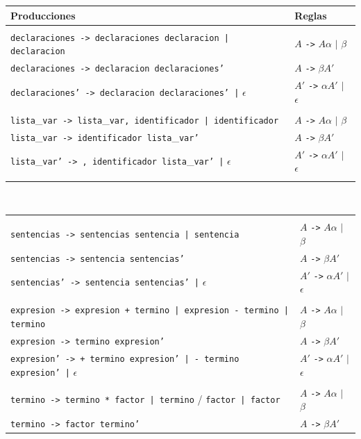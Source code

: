 \documentclass[11pt]{report}
\begin{document}
\begin{enumerate}
\begin{enumerate}[label=\alph*.]
     \begin{tabular}{ |p{13cm}|l| }
  \hline
  \textbf{Producciones} & \textbf{Reglas} \\
  \hline
  & \\
  \texttt{declaraciones -> declaraciones declaracion | declaracion} & $A$ \texttt{->} $A \alpha$ $|$ $\beta$ \\
  \texttt{declaraciones -> declaracion declaraciones'} & $A$ \texttt{->} $\beta A'$ \\
  \texttt{declaraciones' -> declaracion declaraciones' |} $\epsilon$  & $A'$ \texttt{->} $\alpha A'$ $|$ $\epsilon$ \\
  & \\
  \texttt{lista}\_\texttt{var -> lista}\_\texttt{var, identificador | identificador} & $A$ \texttt{->} $A \alpha$ $|$ $\beta$ \\
  \texttt{lista}\_\texttt{var -> identificador lista}\_\texttt{var'} & $A$ \texttt{->} $\beta A'$ \\
  \texttt{lista}\_\texttt{var' -> , identificador lista}\_\texttt{var' |} $\epsilon$ & $A'$ \texttt{->} $\alpha A'$ $|$ $\epsilon$ \\
  & \\
\end{tabular} \\
    \begin{tabular}{ |p{13cm}|l| }
  & \\
  \texttt{sentencias -> sentencias sentencia | sentencia} & $A$ \texttt{->} $A \alpha$ $|$ $\beta$ \\
  \texttt{sentencias -> sentencia sentencias'} & $A$ \texttt{->} $\beta A'$ \\
  \texttt{sentencias' -> sentencia sentencias' |} $\epsilon$ & $A'$ \texttt{->} $\alpha A'$ $|$ $\epsilon$ \\
  & \\
  \texttt{expresion -> expresion + termino | expresion - termino | termino} & $A$ \texttt{->} $A \alpha$ $|$ $\beta$ \\
  \texttt{expresion -> termino expresion'}  & $A$ \texttt{->} $\beta A'$ \\
  \texttt{expresion' -> + termino expresion' | - termino expresion' |} $\epsilon$ & $A'$ \texttt{->} $\alpha A'$ $|$ $\epsilon$ \\
  & \\
  \texttt{termino -> termino * factor | termino} / \texttt{factor | factor} & $A$ \texttt{->} $A \alpha$ $|$ $\beta$ \\
  \texttt{termino -> factor termino'} & $A$ \texttt{->} $\beta A'$ \\

\end{tabular}
\end{enumerate}
\end{enumerate}
\end{document}
